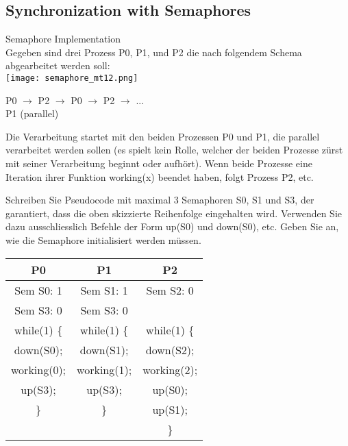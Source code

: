 \subsection{Synchronization with Semaphores}

\begin{example2}{Semaphore Implementation}\\
    Gegeben sind drei Prozess P0, P1, und P2 die nach folgendem Schema abgearbeitet werden soll:\\
    \texttt{[image: semaphore\_mt12.png]}
    \begin{center}
    P0 $\rightarrow$ P2 $\rightarrow$ P0 $\rightarrow$ P2 $\rightarrow$ ...\\
    P1 (parallel)
    \end{center}
    
    Die Verarbeitung startet mit den beiden Prozessen P0 und P1, die parallel verarbeitet werden sollen (es spielt kein Rolle, welcher der beiden Prozesse zürst mit seiner Verarbeitung beginnt oder aufhört). Wenn beide Prozesse eine Iteration ihrer Funktion working(x) beendet haben, folgt Prozess P2, etc.
    
    Schreiben Sie Pseudocode mit maximal 3 Semaphoren S0, S1 und S3, der garantiert, dass die oben skizzierte Reihenfolge eingehalten wird. Verwenden Sie dazu ausschliesslich Befehle der Form up(S0) und down(S0), etc. Geben Sie an, wie die Semaphore initialisiert werden müssen.
    
    \tcblower
    \begin{center}
    \begin{tabular}{|c|c|c|}
    \hline
    \textbf{P0} & \textbf{P1} & \textbf{P2} \\
    \hline
    Sem S0: 1 & Sem S1: 1 & Sem S2: 0 \\
    Sem S3: 0 & Sem S3: 0 & \\
    \hline
    while(1) \{ & while(1) \{ & while(1) \{ \\
    \quad down(S0); & \quad down(S1); & \quad down(S2); \\
    \quad working(0); & \quad working(1); & \quad working(2); \\
    \quad up(S3); & \quad up(S3); & \quad up(S0); \\
    \} & \} & \quad up(S1); \\
     &  & \} \\
    \hline
    \end{tabular}
    \end{center}
    

\end{example2}
